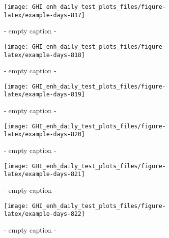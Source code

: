 \documentclass[
  10pt,
  a4paper,oneside]{article}
\begin{document}
\begin{figure}[H]

{\centering \texttt{[image: GHI\_enh\_daily\_test\_plots\_files/figure-latex/example-days-817]} 

}

\caption{ - empty caption - }\label{fig:example-days-817}
\end{figure}

\begin{figure}[H]

{\centering \texttt{[image: GHI\_enh\_daily\_test\_plots\_files/figure-latex/example-days-818]} 

}

\caption{ - empty caption - }\label{fig:example-days-818}
\end{figure}

\begin{figure}[H]

{\centering \texttt{[image: GHI\_enh\_daily\_test\_plots\_files/figure-latex/example-days-819]} 

}

\caption{ - empty caption - }\label{fig:example-days-819}
\end{figure}

\begin{figure}[H]

{\centering \texttt{[image: GHI\_enh\_daily\_test\_plots\_files/figure-latex/example-days-820]} 

}

\caption{ - empty caption - }\label{fig:example-days-820}
\end{figure}

\begin{figure}[H]

{\centering \texttt{[image: GHI\_enh\_daily\_test\_plots\_files/figure-latex/example-days-821]} 

}

\caption{ - empty caption - }\label{fig:example-days-821}
\end{figure}

\begin{figure}[H]

{\centering \texttt{[image: GHI\_enh\_daily\_test\_plots\_files/figure-latex/example-days-822]} 

}

\caption{ - empty caption - }\label{fig:example-days-822}
\end{figure}
\end{document}
